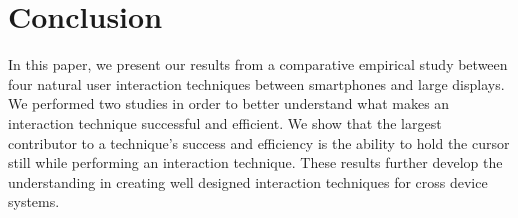 \section{Conclusion}\label{sec:conclusion}
In this paper, we present our results from a comparative empirical study between four natural user interaction techniques between smartphones and large displays. 
We performed two studies in order to better understand what makes an interaction technique successful and efficient. 
We show that the largest contributor to a technique's success and efficiency is the ability to hold the cursor still while performing an interaction technique.
These results further develop the understanding in creating well designed interaction techniques for cross device systems.